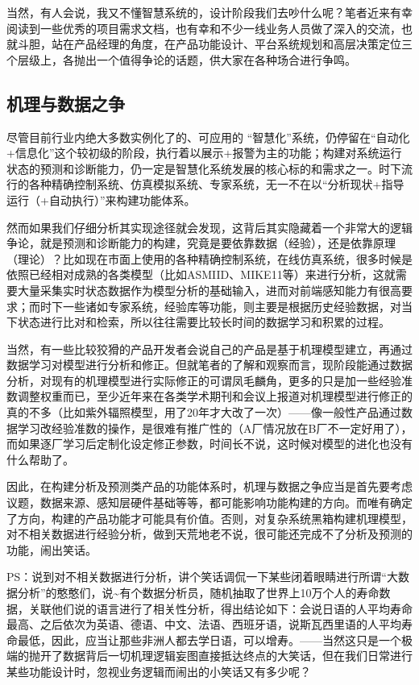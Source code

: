 \documentclass[
]{book}
\begin{document}
当然，有人会说，我又不懂智慧系统的，设计阶段我们去吵什么呢？笔者近来有幸阅读到一些优秀的项目需求文档，也有幸和不少一线业务人员做了深入的交流，也就斗胆，站在产品经理的角度，在产品功能设计、平台系统规划和高层决策定位三个层级上，各抛出一个值得争论的话题，供大家在各种场合进行争鸣。

\hypertarget{ux673aux7406ux4e0eux6570ux636eux4e4bux4e89}{%
\subsection{机理与数据之争}\label{ux673aux7406ux4e0eux6570ux636eux4e4bux4e89}}

尽管目前行业内绝大多数实例化了的、可应用的 ``智慧化''系统，仍停留在``自动化+信息化''这个较初级的阶段，执行着以展示+报警为主的功能；构建对系统运行状态的预测和诊断能力，仍一定是智慧化系统发展的核心标的和需求之一。时下流行的各种精确控制系统、仿真模拟系统、专家系统，无一不在以``分析现状+指导运行（+自动执行）''来构建功能体系。

然而如果我们仔细分析其实现途径就会发现，这背后其实隐藏着一个非常大的逻辑争论，就是预测和诊断能力的构建，究竟是要依靠数据（经验），还是依靠原理（理论）？比如现在市面上使用的各种精确控制系统，在线仿真系统，很多时候是依照已经相对成熟的各类模型（比如ASMIID、MIKE11等）来进行分析，这就需要大量采集实时状态数据作为模型分析的基础输入，进而对前端感知能力有很高要求；而时下一些诸如专家系统，经验库等功能，则主要是根据历史经验数据，对当下状态进行比对和检索，所以往往需要比较长时间的数据学习和积累的过程。

当然，有一些比较狡猾的产品开发者会说自己的产品是基于机理模型建立，再通过数据学习对模型进行分析和修正。但就笔者的了解和观察而言，现阶段能通过数据分析，对现有的机理模型进行实际修正的可谓凤毛麟角，更多的只是加一些经验准数调整权重而已，至少近年来在各类学术期刊和会议上报道对机理模型进行修正的真的不多（比如紫外辐照模型，用了20年才大改了一次）------像一般性产品通过数据学习改经验准数的操作，是很难有推广性的（A厂情况放在B厂不一定好用了），而如果逐厂学习后定制化设定修正参数，时间长不说，这时候对模型的进化也没有什么帮助了。

因此，在构建分析及预测类产品的功能体系时，机理与数据之争应当是首先要考虑议题，数据来源、感知层硬件基础等等，都可能影响功能构建的方向。而唯有确定了方向，构建的产品功能才可能具有价值。否则，对复杂系统黑箱构建机理模型，对不相关数据进行经验分析，做到天荒地老不说，很可能还完成不了分析及预测的功能，闹出笑话。

PS：说到对不相关数据进行分析，讲个笑话调侃一下某些闭着眼睛进行所谓``大数据分析''的憨憨们，说\textasciitilde 有个数据分析员，随机抽取了世界上10万个人的寿命数据，关联他们说的语言进行了相关性分析，得出结论如下：会说日语的人平均寿命最高、之后依次为英语、德语、中文、法语、西班牙语，说斯瓦西里语的人平均寿命最低，因此，应当让那些非洲人都去学日语，可以增寿。------当然这只是一个极端的抛开了数据背后一切机理逻辑妄图直接抵达终点的大笑话，但在我们日常进行某些功能设计时，忽视业务逻辑而闹出的小笑话又有多少呢？
\end{document}
